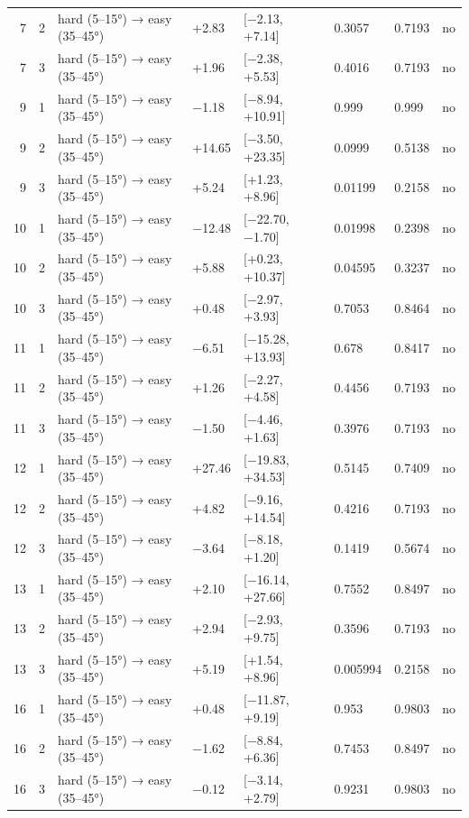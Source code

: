 \begin{table}[htbp]
\begin{tabular}{rlllllll}
    7 & 2 & hard (5–15°) → easy (35–45°) & +2.83 & [−2.13, +7.14] & 0.3057 & 0.7193 & no \\
    7 & 3 & hard (5–15°) → easy (35–45°) & +1.96 & [−2.38, +5.53] & 0.4016 & 0.7193 & no \\
    9 & 1 & hard (5–15°) → easy (35–45°) & −1.18 & [−8.94, +10.91] & 0.999 & 0.999 & no \\
    9 & 2 & hard (5–15°) → easy (35–45°) & +14.65 & [−3.50, +23.35] & 0.0999 & 0.5138 & no \\
    9 & 3 & hard (5–15°) → easy (35–45°) & +5.24 & [+1.23, +8.96] & 0.01199 & 0.2158 & no \\
    10 & 1 & hard (5–15°) → easy (35–45°) & −12.48 & [−22.70, −1.70] & 0.01998 & 0.2398 & no \\
    10 & 2 & hard (5–15°) → easy (35–45°) & +5.88 & [+0.23, +10.37] & 0.04595 & 0.3237 & no \\
    10 & 3 & hard (5–15°) → easy (35–45°) & +0.48 & [−2.97, +3.93] & 0.7053 & 0.8464 & no \\
    11 & 1 & hard (5–15°) → easy (35–45°) & −6.51 & [−15.28, +13.93] & 0.678 & 0.8417 & no \\
    11 & 2 & hard (5–15°) → easy (35–45°) & +1.26 & [−2.27, +4.58] & 0.4456 & 0.7193 & no \\
    11 & 3 & hard (5–15°) → easy (35–45°) & −1.50 & [−4.46, +1.63] & 0.3976 & 0.7193 & no \\
    12 & 1 & hard (5–15°) → easy (35–45°) & +27.46 & [−19.83, +34.53] & 0.5145 & 0.7409 & no \\
    12 & 2 & hard (5–15°) → easy (35–45°) & +4.82 & [−9.16, +14.54] & 0.4216 & 0.7193 & no \\
    12 & 3 & hard (5–15°) → easy (35–45°) & −3.64 & [−8.18, +1.20] & 0.1419 & 0.5674 & no \\
    13 & 1 & hard (5–15°) → easy (35–45°) & +2.10 & [−16.14, +27.66] & 0.7552 & 0.8497 & no \\
    13 & 2 & hard (5–15°) → easy (35–45°) & +2.94 & [−2.93, +9.75] & 0.3596 & 0.7193 & no \\
    13 & 3 & hard (5–15°) → easy (35–45°) & +5.19 & [+1.54, +8.96] & 0.005994 & 0.2158 & no \\
    16 & 1 & hard (5–15°) → easy (35–45°) & +0.48 & [−11.87, +9.19] & 0.953 & 0.9803 & no \\
    16 & 2 & hard (5–15°) → easy (35–45°) & −1.62 & [−8.84, +6.36] & 0.7453 & 0.8497 & no \\
    16 & 3 & hard (5–15°) → easy (35–45°) & −0.12 & [−3.14, +2.79] & 0.9231 & 0.9803 & no \\
    \bottomrule
  \end{tabular}
\end{table}
